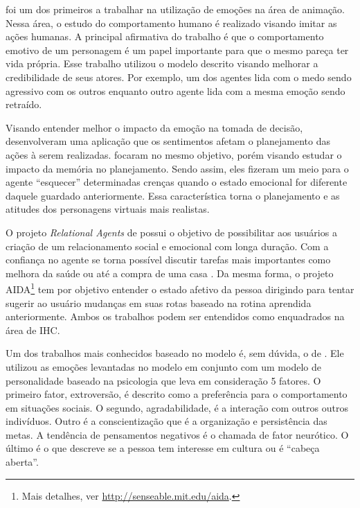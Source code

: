 \citet{bates1994role} foi um dos primeiros a trabalhar na utilização de emoções
na área de animação. Nessa área, o estudo do comportamento humano é
realizado visando imitar as ações humanas. A principal afirmativa do trabalho
é que o comportamento emotivo de um personagem é um papel importante para que
o mesmo pareça ter vida própria. Esse trabalho utilizou o modelo descrito
visando melhorar a credibilidade de seus atores. Por exemplo, um dos agentes
lida com o medo sendo agressivo com os outros enquanto outro agente lida com a
mesma emoção sendo retraído.

Visando entender melhor o impacto da emoção na tomada de decisão,
\citet{zhang2009emotional} desenvolveram uma aplicação que os sentimentos
afetam o planejamento das ações à serem realizadas.
\citet{neto2010construction} focaram no mesmo objetivo, porém visando estudar
o impacto da memória no planejamento. Sendo assim, eles fizeram um meio
para o agente ``esquecer'' determinadas crenças quando o estado emocional
for diferente daquele guardado anteriormente. Essa característica torna o
planejamento e as atitudes dos personagens virtuais mais realistas.

O projeto \emph{Relational Agents} de \citet{bick2003relational} possui o
objetivo de possibilitar aos usuários a criação de um relacionamento social e
emocional com longa duração. Com a confiança no agente se torna possível
discutir tarefas mais importantes como melhora da saúde ou até a compra de uma
casa \cite{bickmore2009virtual}. Da mesma forma, o projeto AIDA\footnote{Mais
detalhes, ver \url{http://senseable.mit.edu/aida}.} tem por objetivo entender
o estado afetivo da pessoa dirigindo para tentar sugerir ao usuário mudanças
em suas rotas baseado na rotina aprendida anteriormente. Ambos os trabalhos
podem ser entendidos como enquadrados na área de IHC.

Um dos trabalhos mais conhecidos baseado no modelo \occ é, sem dúvida, o de
\citet{kshirsagar2002multilayer}. Ele utilizou
as emoções levantadas no modelo em conjunto com um modelo de personalidade
baseado na psicologia que leva em consideração 5 fatores. O primeiro fator,
extroversão, é descrito como a preferência para o comportamento em situações
sociais. O segundo, agradabilidade, é a interação com outros outros
indivíduos. Outro é a conscientização que é a organização e persistência
das metas. A tendência de pensamentos negativos é o chamada de fator
neurótico. O último é o que descreve se a pessoa tem interesse em
cultura ou é ``cabeça aberta''.

